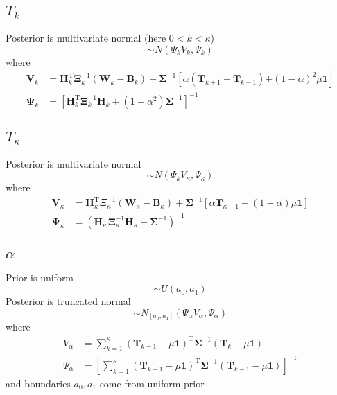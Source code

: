 \documentclass[12pt, letterpaper]{article}
\begin{document}
\subsection{$T_k$}
Posterior is multivariate normal (here $0<k<\kappa$)
\begin{equation}
	\sim N(\Psi_kV_k,\Psi_k)
\end{equation} 
where
\begin{align}
\mathbf{V}_{k}&= \mathbf{H}_{k}^{\mathrm{T}} \mathbf{\Xi}_{k}^{-1}\left(\mathbf{W}_{k}-\mathbf{B}_{k}\right)+\mathbf{\Sigma}^{-1}\left[\alpha\left(\mathbf{T}_{k+1}+\mathbf{T}_{k-1}\right)\right.\left.+(1-\alpha)^{2} \mu \mathbf{1}\right]\\
\boldsymbol{\Psi}_{k}&=\left[\mathbf{H}_{k}^{\mathrm{T}} \boldsymbol{\Xi}_{k}^{-1} \mathbf{H}_{k}+\left(1+\alpha^{2}\right) \mathbf{\Sigma}^{-1}\right]^{-1}
\end{align}

\subsection{$T_\kappa$}

Posterior is multivariate normal
\begin{equation}
	\sim N(\Psi_kV_\kappa,\Psi_\kappa)
\end{equation} 
where
\begin{align}
\mathbf{V}_{\kappa}&=\mathbf{H}_{\kappa}^{\mathrm{T}} \Xi_{\kappa}^{-1}\left(\mathbf{W}_{\kappa}-\mathbf{B}_{\kappa}\right)+\mathbf{\Sigma}^{-1}\left[\alpha \mathbf{T}_{\kappa-1}+(1-\alpha) \mu \mathbf{1}\right]\\
\boldsymbol{\Psi}_{\kappa}&=\left(\mathbf{H}_{\kappa}^{\mathrm{T}} \boldsymbol{\Xi}_{\kappa}^{-1} \mathbf{H}_{\kappa}+\boldsymbol{\Sigma}^{-1}\right)^{-1}
\end{align}

\subsection{$\alpha$}
Prior is uniform
\begin{equation}
	\sim U(a_0,a_1)
\end{equation} 
Posterior is truncated normal
\begin{equation}
\sim N_{\left[a_{0}, a_{1}\right]}\left(\Psi_{\alpha} V_{\alpha}, \Psi_{\alpha}\right)
\end{equation}
where
\begin{align}
V_{\alpha}&=\sum_{k=1}^{\kappa}\left(\mathbf{T}_{k-1}-\mu \mathbf{1}\right)^{\mathrm{T}} \mathbf{\Sigma}^{-1}\left(\mathbf{T}_{k}-\mu \mathbf{1}\right)\\
\Psi_{\alpha}&=\left[\sum_{k=1}^{\kappa}\left(\mathbf{T}_{k-1}-\mu \mathbf{1}\right)^{\mathrm{T}} \mathbf{\Sigma}^{-1}\left(\mathbf{T}_{k-1}-\mu \mathbf{1}\right)\right]^{-1}
\end{align}
and boundaries $a_{0}, a_{1}$ come from uniform prior
\end{document}
